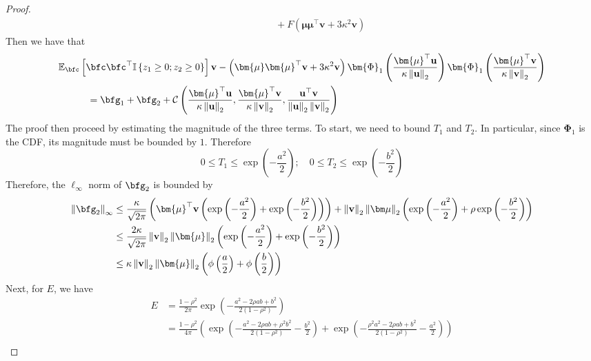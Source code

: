 \documentclass[10pt]{article} %
\theoremstyle{definition}
\theoremstyle{plain}
\newcommand{\paren}[1]{\left(#1\right)}
\newcommand{\norm}[1]{\left\|#1\right\|}
\newcommand{\indy}[1]{\mathbb{I}\left\{#1\right\}}
\providecommand{\E}{\mathbb{E}}
\def\bfu{{\mathbf{u}}}\def\bfv{{\mathbf{v}}}\def\bfw{{\mathbf{w}}}\def\bfx{{\mathbf{x}}}
\begin{document}
\begin{proof}
\begin{equation}
\begin{aligned}
            & \quad\quad\quad + F\paren{\bm{\mu}\bm{\mu}^\top\bfv + 3\kappa^2\bfv}
        \end{aligned}
    \end{equation}
    Then we have that
    \begin{equation}
        \label{eq:exp_mat_vec_diff}
        \begin{aligned}
             & \E_{\bfc}\left[\bfc\bfc^\top\indy{z_1\geq 0;z_2\geq 0}\right]\bfv - \paren{\bm{\mu}\bm{\mu}^\top\bfv + 3\kappa^2\bfv}\bm{\Phi}_1\paren{\frac{\bm{\mu}^\top\bfu}{\kappa\norm{\bfu}_2}}\bm{\Phi}_1\paren{\frac{\bm{\mu}^\top\bfv}{\kappa\norm{\bfv}_2}} \\
             & \quad\quad\quad = \bfg_1 + \bfg_2 + \mathcal{C}\paren{\frac{\bm{\mu}^\top\bfu}{\kappa\norm{\bfu}_2}, \frac{\bm{\mu}^\top\bfv}{\kappa\norm{\bfv}_2}, \frac{\bfu^\top\bfv}{\norm{\bfu}_2\norm{\bfv}_2}}
        \end{aligned}
    \end{equation}
    The proof then proceed by estimating the magnitude of the three terms. To start, we need to bound $T_1$ and $T_2$. In particular, since $\bm{\Phi}_1$ is the CDF, its magnitude must be bounded by $1$. Therefore
    \[
        0\leq T_1 \leq \exp\paren{-\frac{a^2}{2}};\quad 0\leq T_2 \leq \exp\paren{-\frac{b^2}{2}}
    \]
    Therefore, the $\ell_{\infty}$ norm of $\bfg_2$ is bounded by
    \begin{equation}
        \label{eq:g2_bound}
        \begin{aligned}
            \norm{\bfg_2}_{\infty} & \leq \frac{\kappa}{\sqrt{2\pi}}\paren{\bm{\mu}^\top\bfv\paren{\exp\paren{-\frac{a^2}{2}} + \exp\paren{-\frac{b^2}{2}}}} + \norm{\bfv}_2\norm{\bm\mu}_2\paren{\exp\paren{-\frac{a^2}{2}} + \rho\exp\paren{-\frac{b^2}{2}}}\\
            & \leq \frac{2\kappa}{\sqrt{2\pi}}\norm{\bfv}_2\norm{\bm{\mu}}_2\paren{\exp\paren{-\frac{a^2}{2}} + \exp\paren{-\frac{b^2}{2}}}\\
            & \leq \kappa\norm{\bfv}_2\norm{\bm{\mu}}_2\paren{\phi\paren{\frac{a}{2}} + \phi\paren{\frac{b}{2}}}
        \end{aligned}
    \end{equation}
    Next, for $E$, we have
    \begin{align*}
        E & = \frac{1-\rho^2}{2\pi}\exp\paren{-\frac{a^2 - 2\rho ab + b^2}{2\paren{1-\rho^2}}}\\
        & =\frac{1-\rho^2}{4\pi}\paren{\exp\paren{-\frac{a^2 - 2\rho ab + \rho^2b^2}{2\paren{1-\rho^2}} - \frac{b^2}{2}} + \exp\paren{-\frac{\rho^2a^2 - 2\rho ab + b^2}{2\paren{1-\rho^2}} - \frac{a^2}{2}}}\\

\end{align*}
\end{proof}
\end{document}
